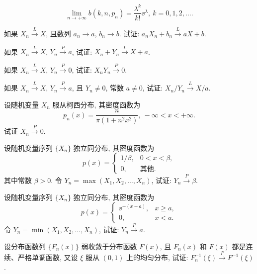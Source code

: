 \begin{xiti}
    \begin{equation*}
        \lim_{n \to +\infty} b ( k, n, p_n ) = \frac{\lambda^k}{k!} \ee^{\lambda}, \ k = 0, 1, 2, \dotsc.
    \end{equation*}
    \item 如果 $ X_n \stackrel{L}{\to} X $, 且数列 $ a_n \to a $, $ b_n \to b $. 试证: $ a_n X_n + b_n \stackrel{L}{\to} a X + b $.
    \item 如果 $ X_n \stackrel{L}{\to} X $, $ Y_n \stackrel{P}{\to} a $, 试证: $ X_n + Y_n \stackrel{L}{\to} X + a $.
    \item 如果 $ X_n \stackrel{L}{\to} X $, $ Y_n \stackrel{P}{\to} 0 $, 试证: $ X_n Y_n \stackrel{P}{\to} 0 $.
    \item 如果 $ X_n \stackrel{L}{\to} X $, $ Y_n \stackrel{P}{\to} a $, 且 $ Y_n \neq 0 $, 常数 $ a \neq 0 $, 试证: $ X_n / Y_n \stackrel{L}{\to} X/a $.
    \item 设随机变量 $ X_n $ 服从柯西分布, 其密度函数为
    \begin{equation*}
        p_n (x) = \frac{n}{\pi (1 + n^2 x^2)}, \ -\infty < x < +\infty.
    \end{equation*}
    试证 $ X_n \stackrel{P}{\to} 0 $.
    \item 设随机变量序列 $ \{ X_n \} $ 独立同分布, 其密度函数为
    \begin{equation*}
        p (x) =
        \begin{cases}
            1 / \beta, & 0 < x < \beta,\\
            0, & \text{其他}.
        \end{cases}
    \end{equation*}
    其中常数 $ \beta > 0 $. 令 $ Y_n = \max ( X_1, X_2, \dotsc, X_n ) $, 试证: $ Y_n \stackrel{P}{\to} \beta $.
    \item 设随机变量序列 $ \{ X_n \} $ 独立同分布, 其密度函数为
    \begin{equation*}
        p (x) =
        \begin{cases}
            \ee^{- ( x - a )}, & x \geq a,\\
            0, & x < a.
        \end{cases}
    \end{equation*}
    令 $ Y_n = \min ( X_1, X_2, \dotsc, X_n ) $, 试证: $ Y_n \stackrel{P}{\to} a $.
    \item 设分布函数列 $ \{ F_n (x) \} $ 弱收敛于分布函数 $ F (x) $, 且 $ F_n (x) $ 和 $ F (x) $ 都是连续、严格单调函数, 又设 $ \xi $ 服从 $ ( 0, 1 ) $ 上的均匀分布, 试证: $ F_n^{-1} ( \xi ) \stackrel{P}{\to} F^{-1} ( \xi ) $.

\end{xiti}

